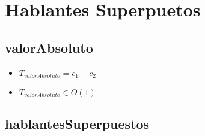 \documentclass{article}
\begin{document}
    \section*{Hablantes Superpuetos}

    \subsection*{valorAbsoluto}

    \begin{minipage}{0.70\textwidth}
        
    \end{minipage}
    \hfill
    \begin{minipage}{0.25\textwidth}
    \end{minipage}

    \begin{itemize}
        \item $T_{valorAbsoluto} = c_1 + c_2$
        \item $T_{valorAbsoluto} \in O(1)$
    \end{itemize}

    \subsection*{hablantesSuperpuestos}
\end{document}
